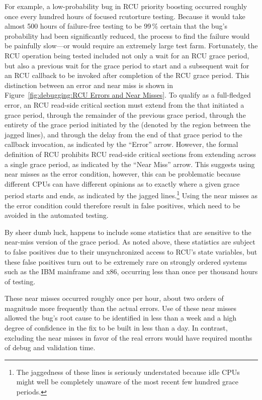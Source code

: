 For example, a low-probability bug in RCU priority boosting occurred
roughly once every hundred hours of focused rcutorture testing.
Because it would take almost 500 hours of failure-free testing to be
99\,\% certain that the bug's probability had been significantly reduced,
the  process
to find the failure would be painfully slow---or would require an extremely
large test farm.
Fortunately, the RCU operation being tested included not only a wait for
an RCU grace period, but also a previous wait for the grace period to start
and a subsequent wait for an RCU callback to be
invoked after completion of the RCU grace period.
This distinction between an  error and near miss is
shown in
Figure~\ref{fig:debugging:RCU Errors and Near Misses}.
To qualify as a full-fledged error, an RCU read-side critical section
must extend from the  that initiated a grace period,
through the remainder of the previous grace period, through the
entirety of the grace period initiated by the 
(denoted by the region between the jagged lines), and
through the delay from the end of that grace period to the callback
invocation, as indicated by the ``Error'' arrow.
However, the formal definition of RCU prohibits RCU read-side critical
sections from extending across a single grace period, as indicated by
the ``Near Miss'' arrow.
This suggests using near misses as the error condition, however, this
can be problematic because different CPUs can have different opinions
as to exactly where a given
grace period starts and ends, as indicated by the jagged lines.\footnote{
	The jaggedness of these lines is seriously understated because
	idle CPUs might well be completely unaware of the most recent
	few hundred grace periods.}
Using the near misses as the error condition could therefore result
in false positives, which need to be avoided in the automated
 testing.

By sheer dumb luck,  happens to include some statistics that
are sensitive to the near-miss version of the grace period.
As noted above, these statistics are subject to false positives due to
their unsynchronized access to RCU's state variables,
but these false positives turn out to be extremely rare on strongly
ordered systems such as the IBM mainframe and x86, occurring less than
once per thousand hours of testing.

These near misses occurred roughly once per hour, about two orders of
magnitude more frequently than the actual errors.
Use of these near misses allowed the bug's root cause to be identified
in less than a week and a high degree of confidence in the fix to be
built in less than a day.
In contrast, excluding the near misses in favor of the real errors would
have required months of debug and validation time.

